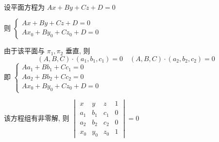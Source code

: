 	\paragraph{} %
		设平面方程为 \( Ax + By + Cz + D = 0 \)

		则 \( \begin{cases}
			Ax + By + Cz + D = 0 \\
			Ax_{0} + By_{0} + Cz_{0} + D = 0
		\end{cases} \)

		由于该平面与 \( \pi_{1}, \pi_{2} \) 垂直, 则
		\[ (A, B, C) \cdot (a_{1}, b_{1}, c_{1}) = 0 \quad (A, B, C) \cdot (a_{2}, b_{2}, c_{2}) = 0 \]
		即 \( \begin{cases}
			Aa_{1} + Bb_{1} + Cc_{1} = 0 \\
			Aa_{2} + Bb_{2} + Cc_{2} = 0 \\
			Ax_{0} + By_{0} + Cz_{0} + D = 0
		\end{cases} \)

		该方程组有非零解, 则 \( \begin{vmatrix}
			x     & y     & z     & 1 \\
			a_{1} & b_{1} & c_{1} & 0 \\
			a_{2} & b_{2} & c_{2} & 0 \\
			x_{0} & y_{0} & z_{0} & 1
		\end{vmatrix} = 0 \)